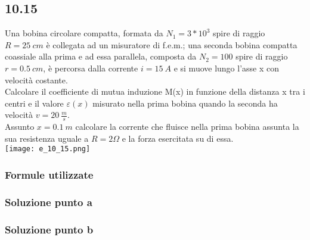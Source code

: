 \documentclass[../../main.tex]{subfiles}
\begin{document}
\subsection*{10.15}
Una bobina circolare compatta, formata da $N_1 = 3 * 10^3$ spire di raggio $R = 25\ cm$ è collegata ad un misuratore di f.e.m.; una seconda bobina compatta coassiale alla prima e ad essa parallela, composta da $N_2 = 100$ spire di raggio $r = 0.5\ cm$, è percorsa dalla corrente $i = 15\ A$ e si muove lungo l'asse x con velocità costante.\\
Calcolare il coefficiente di mutua induzione M(x) in funzione della distanza x tra i centri e il valore $\varepsilon(x)$ misurato nella prima bobina quando la seconda ha velocità $v = 20\ \frac{m}{s}$.\\
Assunto $x = 0.1\ m$ calcolare la corrente che fluisce nella prima bobina assunta la sua resistenza uguale a $R  = 2\Omega$ e la forza esercitata su di essa.\\
\texttt{[image: e\_10\_15.png]}
\subsubsection*{Formule utilizzate}
\subsubsection*{Soluzione punto a}

\subsubsection*{Soluzione punto b}
\newpage
\end{document}
